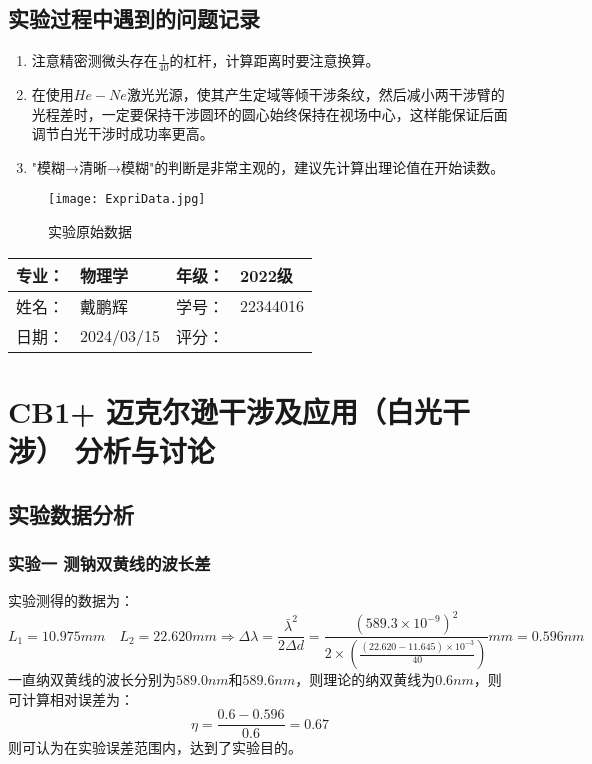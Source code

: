 \documentclass[dvipsnames, svgnames,a4paper,11pt]{article}
\begin{document}
\subsection{实验过程中遇到的问题记录}

\begin{enumerate}
	\item 注意精密测微头存在$\frac{1}{40}$的杠杆，计算距离时要注意换算。
	
	\item 在使用$He-Ne$激光光源，使其产生定域等倾干涉条纹，然后减小两干涉臂的光程差时，一定要保持干涉圆环的圆心始终保持在视场中心，这样能保证后面调节白光干涉时成功率更高。
	\item "模糊→清晰→模糊"的判断是非常主观的，建议先计算出理论值在开始读数。
	
\end{enumerate}
	
	\begin{figure}[htbp]
		\centering
		\texttt{[image: ExpriData.jpg]}
		\caption{实验原始数据}
		\label{fig:ExpriData}
	\end{figure}

\clearpage
\begin{table}
	\renewcommand\arraystretch{1.7}
	\begin{tabularx}{\textwidth}{|X|X|X|X|}
	\hline
	专业：& 物理学 &年级：& 2022级\\
	\hline
	姓名： & 戴鹏辉 & 学号：& 22344016\\
	\hline
    日期：& 2024/03/15 & 评分： &\\
	\hline
	\end{tabularx}
\end{table}

\section{CB1+ \quad 迈克尔逊干涉及应用（白光干涉） \quad\heiti 分析与讨论}

\subsection{实验数据分析}
	
	\subsubsection{实验一 测钠双黄线的波长差}
		实验测得的数据为：
		\[ 
		L_1=10.975mm \quad L_2=22.620mm \Longrightarrow \Delta\lambda=\frac{\bar{\lambda}^2}{2\Delta d}=\frac{(589.3\times10^{-9})^2}{2\times(\frac{(22.620-11.645)\times10^{-3}}{40})}mm=0.596nm
		 \]
		一直纳双黄线的波长分别为$589.0nm$和$589.6nm$，则理论的纳双黄线为$0.6nm$，则可计算相对误差为：
		\[
		\eta=\frac{0.6-0.596}{0.6}=0.67%
		\]
		则可认为在实验误差范围内，达到了实验目的。
		
\end{document}
